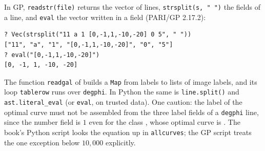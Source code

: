 \begin{sloppypar}
\begin{example}\label{ex:computation:reading-ecdata}
In GP, \texttt{readstr(file)} returns the vector of lines, \texttt{strsplit(s, " ")} the fields of a line, and \texttt{eval} the vector
written in a field (PARI/GP 2.17.2):
\begin{lstlisting}[language=GP]
? Vec(strsplit("11 a 1 [0,-1,1,-10,-20] 0 5", " "))
["11", "a", "1", "[0,-1,1,-10,-20]", "0", "5"]
? eval("[0,-1,1,-10,-20]")
[0, -1, 1, -10, -20]
\end{lstlisting}
The function \texttt{readgal} of  builds a \texttt{Map} from labels to lists of image labels, and its loop
\texttt{tablerow} runs over \texttt{degphi}. In Python the same is \texttt{line.split()} and \texttt{ast.literal\_eval} (or \texttt{eval}, on
trusted data). One caution: the label of the optimal curve must not be assembled from the three label fields of a \texttt{degphi} line, since
the number field is $1$ even for the class , whose optimal curve is . The book's Python script looks the equation up in
\texttt{allcurves}; the GP script treats the one exception below $10{,}000$ explicitly.
\end{example}


\end{sloppypar}
